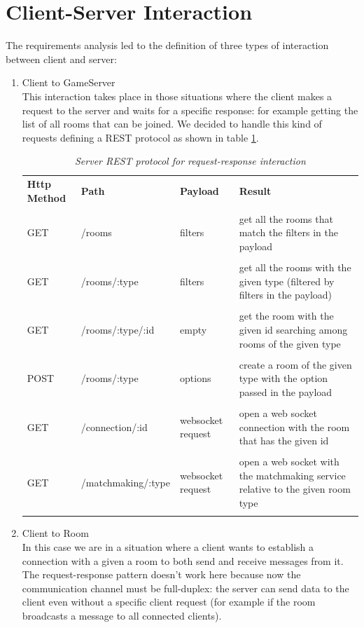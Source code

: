 \section{Client-Server Interaction}
The requirements analysis led to the definition of three types of interaction between client and server:
\begin{enumerate}
	\item Client to GameServer \\
	This interaction takes place in those situations where the client makes a request to the server and waits for a specific response: for example getting the list of all rooms that can be joined. We decided to handle this kind of requests defining a REST protocol as shown in table
	 \ref{table:server_routes}.
	\begin{table}[]
		\begin{tabular}{p{2cm}p{4cm}p{2cm}p{5.5cm}}
			\textbf{Http Method} & \textbf{Path}	  & \textbf{Payload}  & \textbf{Result}                                                            		\\\\
			GET                  & /rooms             & filters           & get all the rooms that match the filters in the payload                        	\\\\
			GET                  & /rooms/:type       & filters           & get all the rooms with the given type (filtered by filters in the payload)     	\\\\
			GET                  & /rooms/:type/:id   & empty             & get the room with the given id searching among rooms of the given type         	\\\\
			POST                 & /rooms/:type       & options           & create a room of the given type with the option passed in the payload          	\\\\
			GET                  & /connection/:id    & websocket request & open a web socket connection with the room that has the given id               	\\\\
			GET                  & /matchmaking/:type & websocket request & open a web socket with the matchmaking service relative to the given room type 	\\\\
		\end{tabular}
		\caption{\label{table:server_routes} \textit{Server REST protocol for request-response interaction}}
	\end{table}
	\item  Client to Room \\
	In this case we are in a situation where a client wants to establish a connection with a given a room to both send and receive messages from it. The request-response pattern doesn't work here because now the communication channel must be full-duplex: the server can send data to the client even without a specific client request (for example if the room broadcasts a message to all connected clients).
	

\end{enumerate}
